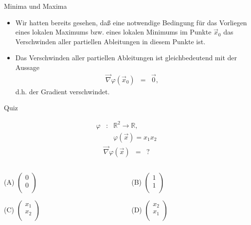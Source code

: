 \documentclass[german]{beamer}
\newcommand{\bq}{\begin{eqnarray*}}
\newcommand{\eq}{\end{eqnarray*}}
\begin{document}
\begin{frame}{Minima und Maxima}

\begin{itemize}
\item Wir hatten bereits gesehen, da{\ss} eine notwendige Bedingung f\"ur das Vorliegen eines lokalen Maximums bzw.
eines lokalen Minimums im Punkte $\vec{x}_0$ das Verschwinden aller partiellen Ableitungen in diesem Punkte ist.
\item Das Verschwinden aller partiellen Ableitungen ist gleichbedeutend mit der Aussage
\bq
 \vec{\nabla} \varphi\left(\vec{x}_0\right) & = & \vec{0},
\eq
d.h. der Gradient verschwindet.
\end{itemize}

\end{frame}

\begin{frame}{Quiz}

\bq
 \varphi & : & {\mathbb R}^2 \rightarrow {\mathbb R},
 \nonumber \\
 & & \varphi\left(\vec{x}\right) = x_1 x_2
\eq
\bq
 \vec{\nabla} \varphi\left(\vec{x}\right)
 & = & ?
\eq
\begin{columns}[b]
\begin{column}{5cm}
\begin{description}
\item{(A)} $\left(\begin{array}{c} 0 \\ 0 \\ \end{array} \right)$
\item{(C)} $\left(\begin{array}{c} x_1 \\ x_2 \\ \end{array} \right)$
\end{description}
\end{column}
\begin{column}{5cm}
\begin{description}
\item{(B)} $\left(\begin{array}{c} 1 \\ 1 \\ \end{array} \right)$
\item{(D)} $\left(\begin{array}{c} x_2 \\ x_1 \\ \end{array} \right)$
\end{description}
\end{column}
\end{columns}

\end{frame}
\end{document}
